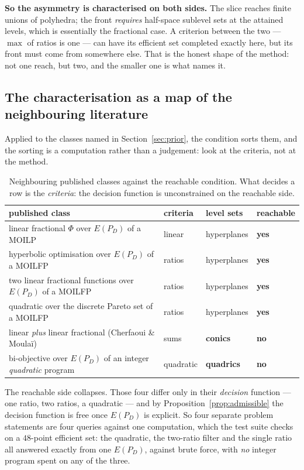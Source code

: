 \documentclass[11pt,a4paper]{article}
\newcommand{\Dset}{D}
\newcommand{\E}{E(P_{\Dset})}
\begin{document}
\textbf{So the asymmetry is characterised on both sides.}  The slice reaches
finite unions of polyhedra; the front \emph{requires} half-space sublevel sets
at the attained levels, which is essentially the fractional case.  A criterion
between the two --- $\max$ of ratios is one --- can have its efficient set
completed exactly here, but its
front must come from somewhere else.  That is the honest shape of the method:
not one reach, but two, and the smaller one is what names it.

\subsection{The characterisation as a map of the neighbouring literature}
\label{sec:map}

Applied to the classes named in Section~\ref{sec:prior}, the condition sorts
them, and the sorting is a computation rather than a judgement: look at the
criteria, not at the method.

\begin{table}[h]
\centering
\caption{Neighbouring published classes against the reachable condition.  What
decides a row is the \emph{criteria}: the decision function is unconstrained on
the reachable side.}
\label{tab:map}
\small
\begin{tabular}{p{}p{}p{}l}
\toprule
published class & criteria & level sets & reachable \\
\midrule
linear fractional $\Phi$ over $\E$ of a MOILP
  & linear & hyperplanes & \textbf{yes} \\
hyperbolic optimisation over $\E$ of a MOILFP
  & ratios & hyperplanes & \textbf{yes} \\
two linear fractional functions over $\E$ of a MOILFP
  & ratios & hyperplanes & \textbf{yes} \\
quadratic over the discrete Pareto set of a MOILFP
  & ratios & hyperplanes & \textbf{yes} \\
\midrule
linear \emph{plus} linear fractional (Cherfaoui \& Moula\"i)
  & sums & \textbf{conics} & \textbf{no} \\
bi-objective over $\E$ of an integer \emph{quadratic} program
  & quadratic & \textbf{quadrics} & \textbf{no} \\
\bottomrule
\end{tabular}
\end{table}

\noindent
The reachable side collapses.  Those four differ only in their \emph{decision}
function --- one ratio, two ratios, a quadratic --- and by
Proposition~\ref{prop:admissible} the decision function is free once $\E$ is
explicit.  So four separate problem statements are four queries against one
computation, which the test suite checks on a $48$-point efficient set: the
quadratic, the two-ratio filter and the single ratio all answered exactly from
one $\E$, against brute force, with \emph{no} integer program spent on any of
the three.
\end{document}
